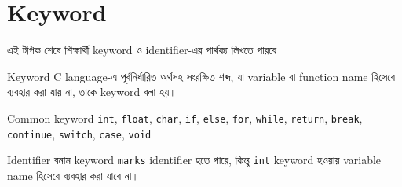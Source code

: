 \section{Keyword}

\begin{learningbox}
এই টপিক শেষে শিক্ষার্থী keyword ও identifier-এর পার্থক্য লিখতে পারবে।
\end{learningbox}

\begin{definitionbox}{Keyword}
C language-এ পূর্বনির্ধারিত অর্থসহ সংরক্ষিত শব্দ, যা variable বা function name হিসেবে ব্যবহার করা যায় না, তাকে keyword বলা হয়।
\end{definitionbox}

\begin{keypointbox}{Common keyword}
\texttt{int}, \texttt{float}, \texttt{char}, \texttt{if}, \texttt{else}, \texttt{for}, \texttt{while}, \texttt{return}, \texttt{break}, \texttt{continue}, \texttt{switch}, \texttt{case}, \texttt{void}
\end{keypointbox}

\begin{examplebox}{Identifier বনাম keyword}
\texttt{marks} identifier হতে পারে, কিন্তু \texttt{int} keyword হওয়ায় variable name হিসেবে ব্যবহার করা যাবে না।
\end{examplebox}
